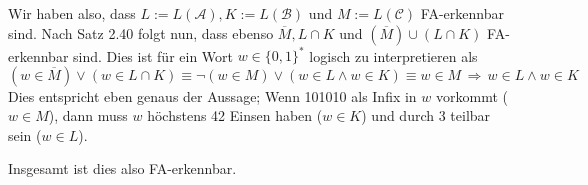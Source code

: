 \documentclass[a4paper,graphics,11pt]{article}
\begin{document}
Wir haben also, dass $L := L(\mathcal{A}), K := L(\mathcal{B})$ und $M := L(\mathcal{C})$ FA-erkennbar sind.
Nach Satz 2.40 folgt nun, dass ebenso $\overline{M}, L \cap K$ und $(\overline{M}) \cup (L \cap K)$ FA-erkennbar
sind.
Dies ist für ein Wort $w \in \{0, 1\}^*$ logisch zu interpretieren als
$$
    (w \in \overline{M}) \lor (w \in L \cap K)
    \equiv \lnot (w \in M) \lor (w \in L \land w \in K)
    \equiv w \in M \,\Longrightarrow\, w \in L \land w \in K
$$
Dies entspricht eben genaus der Aussage; Wenn 101010 als Infix in $w$ vorkommt ($w \in M$), dann muss 
$w$ höchstens 42 Einsen haben ($w \in K$) und durch 3 teilbar sein ($w \in L$).

Insgesamt ist dies also FA-erkennbar.
\end{document}
